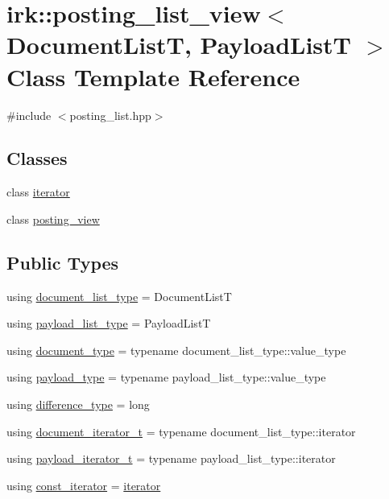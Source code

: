 \hypertarget{classirk_1_1posting__list__view}{}\section{irk\+:\+:posting\+\_\+list\+\_\+view$<$ Document\+ListT, Payload\+ListT $>$ Class Template Reference}
\label{classirk_1_1posting__list__view}


{\ttfamily \#include $<$posting\+\_\+list.\+hpp$>$}

\subsection*{Classes}
\begin{DoxyCompactItemize}
\item 
class \mbox{\hyperlink{classirk_1_1posting__list__view_1_1iterator}{iterator}}
\item 
class \mbox{\hyperlink{classirk_1_1posting__list__view_1_1posting__view}{posting\+\_\+view}}
\end{DoxyCompactItemize}
\subsection*{Public Types}
\begin{DoxyCompactItemize}
\item 
using \mbox{\hyperlink{classirk_1_1posting__list__view_ae024545dbbb464926a2024d956b7b7af}{document\+\_\+list\+\_\+type}} = Document\+ListT
\item 
using \mbox{\hyperlink{classirk_1_1posting__list__view_aabf1afcb3a994971f30879354301e1fe}{payload\+\_\+list\+\_\+type}} = Payload\+ListT
\item 
using \mbox{\hyperlink{classirk_1_1posting__list__view_ac4615e6e3d8ee1eb9a847b7a34919977}{document\+\_\+type}} = typename document\+\_\+list\+\_\+type\+::value\+\_\+type
\item 
using \mbox{\hyperlink{classirk_1_1posting__list__view_a1c394061061a8eeeab98cb228f6cdde9}{payload\+\_\+type}} = typename payload\+\_\+list\+\_\+type\+::value\+\_\+type
\item 
using \mbox{\hyperlink{classirk_1_1posting__list__view_aeae778b6aa26eadf11e1b799bb46547d}{difference\+\_\+type}} = long
\item 
using \mbox{\hyperlink{classirk_1_1posting__list__view_abaca622760e6da2c67d55cf35207250f}{document\+\_\+iterator\+\_\+t}} = typename document\+\_\+list\+\_\+type\+::iterator
\item 
using \mbox{\hyperlink{classirk_1_1posting__list__view_a5a153169348a164ea2cb1a18dc76e279}{payload\+\_\+iterator\+\_\+t}} = typename payload\+\_\+list\+\_\+type\+::iterator
\item 
using \mbox{\hyperlink{classirk_1_1posting__list__view_ae21b790c3e482f513bb41d4f8e7ae0c9}{const\+\_\+iterator}} = \mbox{\hyperlink{classirk_1_1posting__list__view_1_1iterator}{iterator}}
\end{DoxyCompactItemize}
